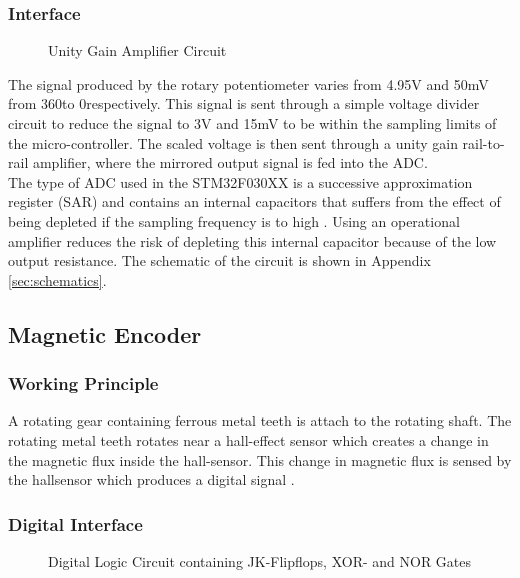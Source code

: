 \subsubsection{Interface}
\begin{figure}[h]
	\centering
	
	\caption{Unity Gain Amplifier Circuit}
	\label{fig:unitygain}
\end{figure}
The signal produced by the rotary potentiometer varies from 4.95V and 50mV from 360\textdegree \space to 0\textdegree \space respectively. This signal is sent through a simple voltage divider circuit to reduce the signal to 3V and 15mV to be within the sampling limits of the micro-controller. The scaled voltage is then sent through a unity gain rail-to-rail amplifier, where the mirrored output signal is fed into the ADC.\\

The type of ADC used in the STM32F030XX is a successive approximation register (SAR) and contains an internal capacitors that suffers from the effect of being depleted if the sampling frequency is to high \citep{stm32_ADC:2017}. Using an operational amplifier reduces the risk of depleting this internal capacitor because of the low output resistance. The schematic of the circuit is shown in Appendix \ref{sec:schematics}.\\

\subsection{Magnetic Encoder}
\subsubsection{Working Principle}
A rotating gear containing ferrous metal teeth is attach to the rotating shaft. The rotating metal teeth rotates near a hall-effect sensor which creates a change in the magnetic flux inside the hall-sensor. This change in magnetic flux is sensed by the hallsensor which produces a digital signal \citep{hallsensor}.
\subsubsection{Digital Interface} 

\begin{figure}[h]
	\centering
	
	\caption{Digital Logic Circuit containing JK-Flipflops, XOR- and NOR Gates}
	\label{fig:jk_xor}
\end{figure}

